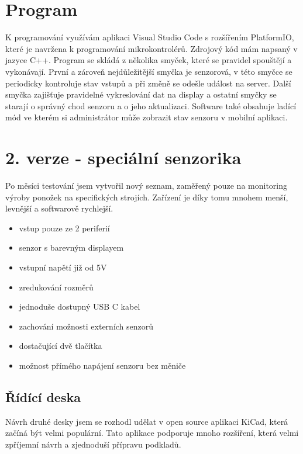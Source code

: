 \section{Program}
K programování využívám aplikaci Visual Studio Code s rozšířením PlatformIO, které je navržena k programování mikrokontrolérů. 
Zdrojový kód mám napsaný v jazyce C++.
Program se skládá z několika smyček, které se pravidel spouštějí a vykonávají.
První a zároveň nejdůležitější smyčka je senzorová, v této smyčce se periodicky kontroluje stav vstupů a při změně se odešle událost na server.
Další smyčka zajišťuje pravidelné vykreslování dat na display a ostatní smyčky se starají o správný chod senzoru a o jeho aktualizaci.
Software také obsahuje ladící mód ve kterém si administrátor může zobrazit stav senzoru v mobilní aplikaci. 


\fxnote[author=JA]{\textcolor{mygreen}{Obrázek deksa => krabička}}

\newpage

\section{2. verze - speciální senzorika}

Po měsíci testování jsem vytvořil nový seznam, zaměřený pouze na monitoring výroby ponožek na specifických strojích.
Zařízení je díky tomu mnohem menší, levnější a softwarově rychlejší.

\begin{itemize}
    \item vstup pouze ze 2 periferií
    \item senzor s barevným displayem
    \item vstupní napětí již od 5V
    \item zredukování rozměrů
    \item jednoduše dostupný USB C kabel
    \item zachování možnosti externích senzorů
    \item dostačující dvě tlačítka
    \item možnost přímého napájení senzoru bez měniče
\end{itemize}

\subsection{Řídící deska}
Návrh druhé desky jsem se rozhodl udělat v open source aplikaci KiCad, která začíná být velmi populární. 
Tato aplikace podporuje mnoho rozšíření, která velmi zpříjemní návrh a zjednoduší přípravu podkladů.

